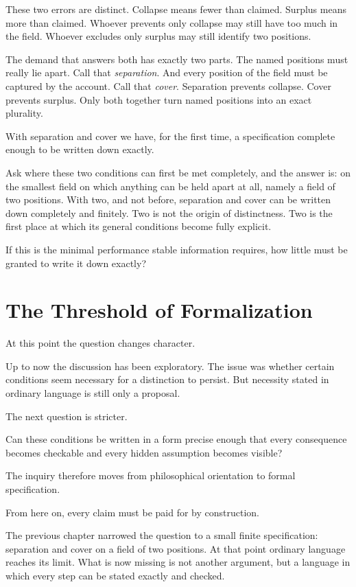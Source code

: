 \documentclass[11pt,a4paper]{book}
\begin{document}
These two errors are distinct. Collapse means fewer than claimed. Surplus
means more than claimed. Whoever prevents only collapse may still have too
much in the field. Whoever excludes only surplus may still identify two
positions.

The demand that answers both has exactly two parts. The named positions must
really lie apart. Call that \emph{separation}. And every position of the
field must be captured by the account. Call that \emph{cover}. Separation
prevents collapse. Cover prevents surplus. Only both together turn named
positions into an exact plurality.

With separation and cover we have, for the first time, a specification
complete enough to be written down exactly.

Ask where these two conditions can first be met completely, and the answer
is: on the smallest field on which anything can be held apart at all,
namely a field of two positions. With two, and not before, separation and
cover can be written down completely and finitely. Two is not the origin of
distinctness. Two is the first place at which its general conditions become
fully explicit.

If this is the minimal performance stable information requires, how little
must be granted to write it down exactly?

\chapter{The Threshold of Formalization}
\label{ch:crossing}

At this point the question changes character.

Up to now the discussion has been exploratory. The issue was whether certain
conditions seem necessary for a distinction to persist. But necessity stated
in ordinary language is still only a proposal.

The next question is stricter.

Can these conditions be written in a form precise enough that every
consequence becomes checkable and every hidden assumption becomes visible?

The inquiry therefore moves from philosophical orientation to formal
specification.

From here on, every claim must be paid for by construction.

The previous chapter narrowed the question to a small finite
specification: separation and cover on a field of two positions. At that
point ordinary language reaches its limit. What is now missing is not
another argument, but a language in which every step can be stated exactly
and checked.
\end{document}
